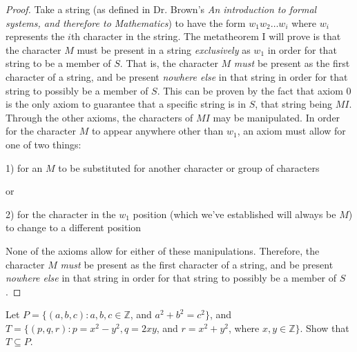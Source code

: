 \documentclass[12pt]{article}
\newenvironment{problem}[2][Problem]{\begin{trivlist}
\item[\hskip \labelsep {\bfseries #1}\hskip \labelsep {\bfseries #2.}]}{\end{trivlist}}
\begin{document}
\begin{proof}
Take a string (as defined in Dr. Brown's \textit{An introduction to formal systems, and therefore to Mathematics}) to have the form $w_1w_2\ldots w_i$ where $w_i$ represents the $i$th character in the string. The metatheorem I will prove is that the character $M$ must be present in a string \textit{exclusively} as $w_1$ in order for that string to be a member of $S$. That is, the character $M$ \textit{must} be present as the first character of a string, and be present \textit{nowhere else} in that string in order for that string to possibly be a member of $S$. This can be proven by the fact that axiom 0 is the only axiom to guarantee that a specific string is in $S$, that string being $MI$. Through the other axioms, the characters of $MI$ may be manipulated. In order for the character $M$ to appear anywhere other than $w_1$, an axiom must allow for one of two things:
\begin{description}
\item{1)} for an $M$ to be substituted for another character or group of characters
\item or
\item{2)} for the character in the $w_1$ position (which we've established will always be $M$) to change to a different position
\end{description}

None of the axioms allow for either of these manipulations. Therefore, the character $M$ \textit{must} be present as the first character of a string, and be present \textit{nowhere else} in that string in order for that string to possibly be a member of $S$.
\end{proof}
\newpage
\begin{problem}[Set Theory Exercise]{6}
Let $P = \{(a,b,c): a,b,c \in\mathbb{Z}$, and $a^2 + b^2 = c^2\}$, and $T = \{(p,q,r) : p = x^2 - y^2, q =2xy$, and $r=x^2 + y^2$, where $x,y \in\mathbb{Z}\}$. Show that $T \subseteq P$.
\end{problem}
\end{document}
